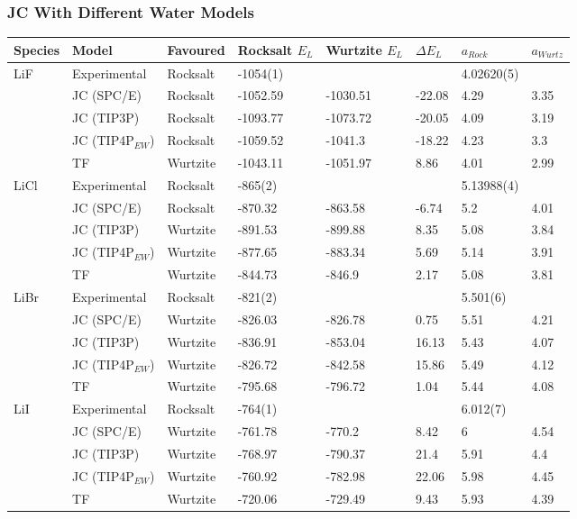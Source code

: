 \documentclass{beamer}
\newenvironment{noheadline}{
	\setbeamertemplate{headline}{}
	\addtobeamertemplate{frametitle}{\vspace*{-0.9\baselineskip}}{}
}{}
\begin{document}
\begin{noheadline}
\begin{frame}
\frametitle{JC With Different Water Models}
\begin{table}[]
	{\tiny
	\begin{tabular}{l|lllllll}
		Species & Model & Favoured & Rocksalt $E_{L}$ & Wurtzite $E_{L}$ & $\Delta E_{L}$ & $a_{Rock}$ & $a_{Wurtz}$ \\ \hline
		\multirow{5}{*}{LiF} & Experimental & Rocksalt & -1054(1) &  &  & 4.02620(5) &  \\
		& JC (SPC/E) & Rocksalt & -1052.59 & -1030.51 & -22.08 & 4.29 & 3.35 \\
		& JC (TIP3P) & Rocksalt & -1093.77 & -1073.72 & -20.05 & 4.09 & 3.19 \\
		& JC (TIP4P$_{EW}$) & Rocksalt & -1059.52 & -1041.3 & -18.22 & 4.23 & 3.3 \\
		& TF & Wurtzite & -1043.11 & -1051.97 & 8.86 & 4.01 & 2.99 \\ \hline
		\multirow{5}{*}{LiCl} & Experimental & Rocksalt & -865(2) &  &  & 5.13988(4) &  \\
		& JC (SPC/E) & Rocksalt & -870.32 & -863.58 & -6.74 & 5.2 & 4.01 \\
		& JC (TIP3P) & Wurtzite & -891.53 & -899.88 & 8.35 & 5.08 & 3.84 \\
		& JC (TIP4P$_{EW}$) & Wurtzite & -877.65 & -883.34 & 5.69 & 5.14 & 3.91 \\
		& TF & Wurtzite & -844.73 & -846.9 & 2.17 & 5.08 & 3.81 \\ \hline
		\multirow{5}{*}{LiBr} & Experimental & Rocksalt & -821(2) &  &  & 5.501(6) &  \\
		& JC (SPC/E) & Wurtzite & -826.03 & -826.78 & 0.75 & 5.51 & 4.21 \\
		& JC (TIP3P) & Wurtzite & -836.91 & -853.04 & 16.13 & 5.43 & 4.07 \\
		& JC (TIP4P$_{EW}$) & Wurtzite & -826.72 & -842.58 & 15.86 & 5.49 & 4.12 \\
		& TF & Wurtzite & -795.68 & -796.72 & 1.04 & 5.44 & 4.08 \\ \hline
		\multirow{5}{*}{LiI} & Experimental & Rocksalt & -764(1) &  &  & 6.012(7) &  \\
		& JC (SPC/E) & Wurtzite & -761.78 & -770.2 & 8.42 & 6 & 4.54 \\
		& JC (TIP3P) & Wurtzite & -768.97 & -790.37 & 21.4 & 5.91 & 4.4 \\
		& JC (TIP4P$_{EW}$) & Wurtzite & -760.92 & -782.98 & 22.06 & 5.98 & 4.45 \\
		& TF & Wurtzite & -720.06 & -729.49 & 9.43 & 5.93 & 4.39
	\end{tabular}
	}
\end{table}
\end{frame}


\end{noheadline}
\end{document}
